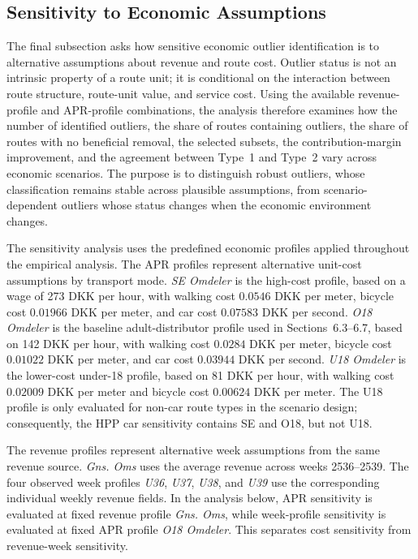 \documentclass[preprint,12pt]{elsarticle}
\begin{document}
\subsection{Sensitivity to Economic Assumptions}
\label{subsec:sensitivity-to-economic-assumptions}

The final subsection asks how sensitive economic outlier identification is to alternative assumptions about revenue and route cost. Outlier status is not an intrinsic property of a route unit; it is conditional on the interaction between route structure, route-unit value, and service cost. Using the available revenue-profile and APR-profile combinations, the analysis therefore examines how the number of identified outliers, the share of routes containing outliers, the share of routes with no beneficial removal, the selected subsets, the contribution-margin improvement, and the agreement between Type~1 and Type~2 vary across economic scenarios. The purpose is to distinguish robust outliers, whose classification remains stable across plausible assumptions, from scenario-dependent outliers whose status changes when the economic environment changes.

The sensitivity analysis uses the predefined economic profiles applied throughout the empirical analysis. The APR profiles represent alternative unit-cost assumptions by transport mode. \textit{SE Omdeler} is the high-cost profile, based on a wage of 273 DKK per hour, with walking cost $0.0546$ DKK per meter, bicycle cost $0.01966$ DKK per meter, and car cost $0.07583$ DKK per second. \textit{O18 Omdeler} is the baseline adult-distributor profile used in Sections~6.3--6.7, based on 142 DKK per hour, with walking cost $0.0284$ DKK per meter, bicycle cost $0.01022$ DKK per meter, and car cost $0.03944$ DKK per second. \textit{U18 Omdeler} is the lower-cost under-18 profile, based on 81 DKK per hour, with walking cost $0.02009$ DKK per meter and bicycle cost $0.00624$ DKK per meter. The U18 profile is only evaluated for non-car route types in the scenario design; consequently, the HPP car sensitivity contains SE and O18, but not U18.

The revenue profiles represent alternative week assumptions from the same revenue source. \textit{Gns. Oms} uses the average revenue across weeks 2536--2539. The four observed week profiles \textit{U36}, \textit{U37}, \textit{U38}, and \textit{U39} use the corresponding individual weekly revenue fields. In the analysis below, APR sensitivity is evaluated at fixed revenue profile \textit{Gns. Oms}, while week-profile sensitivity is evaluated at fixed APR profile \textit{O18 Omdeler}. This separates cost sensitivity from revenue-week sensitivity.
\end{document}
